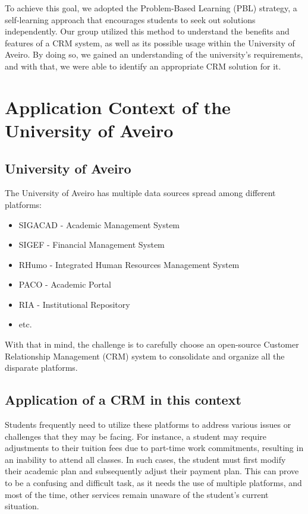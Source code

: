 \documentclass{article}
\begin{document}
To achieve this goal, we adopted the Problem-Based Learning (PBL) strategy, a self-learning approach that encourages students to seek out solutions independently. Our group utilized this method to understand the benefits and features of a CRM system, as well as its possible usage within the University of Aveiro. By doing so, we gained an understanding of the university's requirements, and with that, we were able to identify an appropriate CRM solution for it.


\section{Application Context of the University of Aveiro}

\subsection{University of Aveiro}

The University of Aveiro has multiple data sources spread among different platforms:

\begin{itemize}
    \item SIGACAD - Academic Management System
    \item SIGEF - Financial Management System
    \item RHumo - Integrated Human Resources Management System
    \item PACO - Academic Portal
    \item RIA - Institutional Repository
    \item etc.
\end{itemize}

With that in mind, the challenge is to carefully choose an open-source Customer Relationship Management (CRM) system to consolidate and organize all the disparate platforms.

\subsection{Application of a CRM in this context}

Students frequently need to utilize these platforms to address various issues or challenges that they may be facing. For instance, a student may require adjustments to their tuition fees due to part-time work commitments, resulting in an inability to attend all classes. In such cases, the student must first modify their academic plan and subsequently adjust their payment plan. This can prove to be a confusing and difficult task, as it needs the use of multiple platforms, and most of the time, other services remain unaware of the student's current situation.
\end{document}
